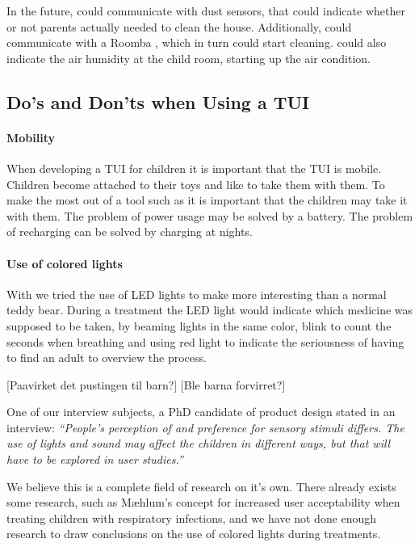 In the future, \buddy{} could communicate with dust sensors, that could indicate whether or not parents actually needed to clean the house. Additionally, \buddy{} could communicate with a Roomba , which in turn could start cleaning. \buddy{} could also indicate the air humidity at the child room, starting up the air condition.   


\subsection{Do's and Don'ts when Using a TUI}
\label{sec:dosanddontsfortui}

\paragraph{Mobility}
When developing a TUI for children it is important that the TUI is mobile. Children become attached to their toys and like to take them with them. To make the most out of a tool such as \buddy{} it is important that the children may take it with them. The problem of power usage may be solved by a battery. The problem of recharging can be solved by charging at nights. 

\paragraph{Use of colored lights}
With \buddy{} we tried the use of LED lights to make \buddy{} more interesting than a normal teddy bear. During a treatment the LED light would indicate which medicine was supposed to be taken, by beaming lights in the same color, blink to count the seconds when breathing and using red light to indicate the seriousness of having to find an adult to overview the process. 

[Paavirket det pustingen til barn?]
[Ble barna forvirret?]

One of our interview subjects, a PhD candidate of product design stated in an interview: 
\textit{``People's perception of and preference for sensory stimuli differs. The use of lights and sound may affect the children in different ways, but that will have to be explored in user studies.''} 

We believe this is a complete field of research on it's own. There already exists some research, such as M\ae hlum's concept for increased user acceptability when treating children with respiratory infections\cite{mahlum2013}, and we have not done enough research to draw conclusions on the use of colored lights during treatments. 


